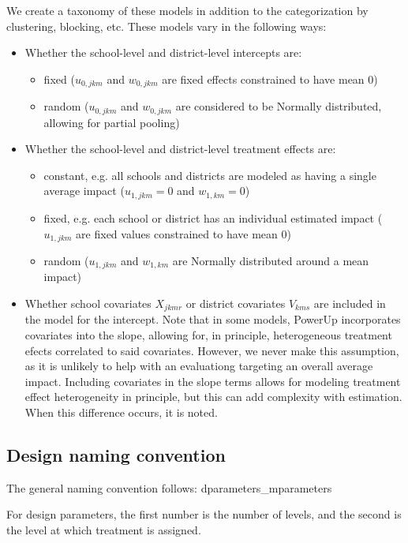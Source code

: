 \documentclass[12pt]{article}
\begin{document}
We create a taxonomy of these models in addition to the categorization by clustering, blocking, etc.
These models vary in the following ways:
\begin{itemize}
\item Whether the school-level and district-level intercepts are:
\begin{itemize}
\item fixed ($u_{0,jkm}$ and $w_{0,jkm}$ are fixed effects constrained to have mean 0)
\item random ($u_{0,jkm}$ and $w_{0,jkm}$ are considered to be Normally distributed, allowing for partial pooling)
\end{itemize}
\item Whether the school-level and district-level treatment effects are:
\begin{itemize}
\item constant, e.g. all schools and districts are modeled as having a single average impact ($u_{1,jkm}= 0$ and $w_{1,km} = 0$)
\item fixed, e.g. each school or district has an individual estimated impact ($u_{1,jkm}$ are fixed values constrained to have mean 0)
\item random ($u_{1,jkm}$ and $w_{1,km}$ are Normally distributed around a mean impact)
\end{itemize}
\item Whether school covariates $X_{jkmr}$ or district covariates $V_{kms}$  are included in the model for the intercept. Note that in some models, PowerUp incorporates covariates into the slope, allowing for, in principle, heterogeneous treatment efects correlated to said covariates. However, we never make this assumption, as it is unlikely to help with an evaluationg targeting an overall average impact. Including covariates in the slope terms allows for modeling treatment effect heterogeneity in principle, but this can add complexity with estimation. When this difference occurs, it is noted.
\end{itemize}

\subsection{Design naming convention}

The general naming convention follows:
dparameters\_mparameters

For design parameters, the first number is the number of levels, and the second is the level at which treatment is assigned.
\end{document}
